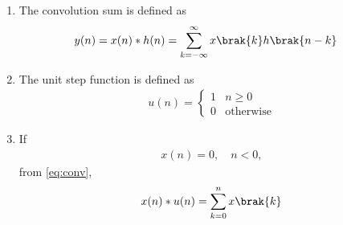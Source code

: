 \begin{enumerate}[label=\thechapter.\arabic*,ref=\thechapter.\theenumi]

\item The convolution sum is defined as
\begin{align}
	y(n) &= x(n)* h(n) = \sum_{k=-\infty}^{\infty}x\brak{k}h\brak{n-k}
	\label{eq:conv}
\end{align}
\item The unit step function is defined as
\begin{align}
	u(n) = 
	\begin{cases}
		1 & n \ge 0
		\\
		0 & \text{otherwise}
	\end{cases}
	\label{eq:unit-step}
\end{align}
\item If 
\begin{align}
	x(n) = 0, \quad n < 0, 
\end{align}
from 
	\eqref{eq:conv},
\begin{align}
	x(n)*u(n)  = \sum_{k=0}^{n}x\brak{k}
	\label{eq:conv-sum}
\end{align}
\end{enumerate}
